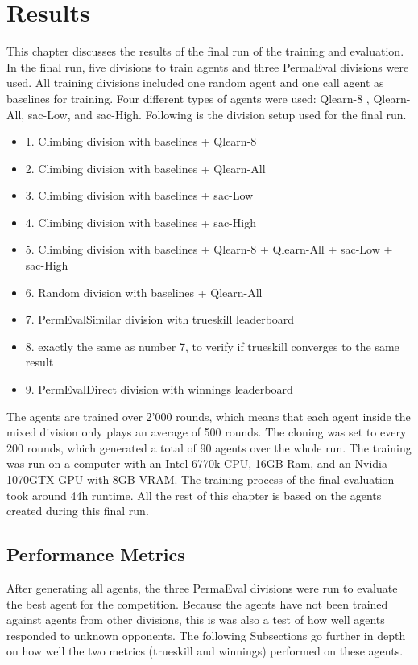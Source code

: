 \chapter{Results}
This chapter discusses the results of the final run of the training and evaluation. In the final run, five divisions to train agents and three  PermaEval divisions were used. All training divisions included one random agent and one call agent as baselines for training. Four different types of agents were used: Qlearn-8 , Qlearn-All, sac-Low, and sac-High. Following is the division setup used for the final run.
\begin{itemize}
    \item 1. Climbing division with baselines + Qlearn-8
    \item 2. Climbing division with baselines + Qlearn-All
    \item 3. Climbing division with baselines + sac-Low
    \item 4. Climbing division with baselines + sac-High
    \item 5. Climbing division with baselines + Qlearn-8 + Qlearn-All + sac-Low + sac-High
    \item 6. Random division with baselines + Qlearn-All
    \item 7. PermEvalSimilar division with trueskill leaderboard
    \item 8. exactly the same as number 7, to verify if trueskill converges to the same result
    \item 9. PermEvalDirect division with winnings leaderboard
\end{itemize}
The agents are trained over 2'000 rounds, which means that each agent inside the mixed division only plays an average of 500 rounds. The cloning was set to every 200 rounds, which generated a total of 90 agents over the whole run.
The training was run on a computer with an Intel 6770k CPU, 16GB Ram, and an Nvidia 1070GTX GPU with 8GB VRAM. The training process of the final evaluation took around 44h runtime. All the rest of this chapter is based on the agents created during this final run.


\section{Performance Metrics}
After generating all agents, the three PermaEval divisions were run to evaluate the best agent for the competition. Because the agents have not been trained against agents from other divisions, this is was also a test of how well agents responded to unknown opponents. The following Subsections go further in depth on how well the two metrics (trueskill and winnings) performed on these agents.

